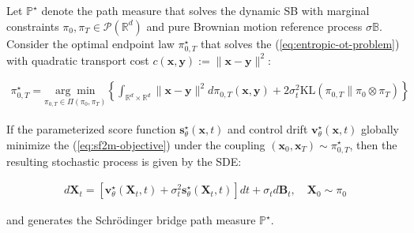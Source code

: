 \documentclass{article}
\begin{document}
\begin{proposition}
    Let $\mathbb{P}^\star$ denote the path measure that solves the dynamic SB with marginal constraints $\pi_0, \pi_T\in \mathcal{P}(\mathbb{R}^d)$ and pure Brownian motion reference process $\sigma\mathbb{B}$. Consider the optimal endpoint law $\pi_{0,T}^\star$ that solves the (\ref{eq:entropic-ot-problem}) with quadratic transport cost $c(\boldsymbol{x},\boldsymbol{y}):= \|\boldsymbol{x}-\boldsymbol{y}\|^2 $:
    \begin{small}
    \begin{align}
        \pi^\star_{0,T}=\underset{\pi_{0,T}\in \Pi(\pi_0, \pi_T)}{\arg\min}\left\{\int_{\mathbb{R}^d\times \mathbb{R}^d}\|\boldsymbol{x}-\boldsymbol{y}\|^2 d\pi_{0,T}(\boldsymbol{x},\boldsymbol{y})+ 2\sigma^2_t\text{KL} (\pi_{0,T}\|\pi_0\otimes \pi_T)\right\}
    \end{align}
    \end{small}
    If the parameterized score function $\boldsymbol{s}^\star_\theta(\boldsymbol{x},t)$ and control drift $\boldsymbol{v}^\star_\theta(\boldsymbol{x},t)$ globally minimize the (\ref{eq:sf2m-objective}) under the coupling $(\boldsymbol{x}_0, \boldsymbol{x}_T)\sim \pi_{0,T}^\star$, then the resulting stochastic process is given by the SDE:
    \begin{small}
    \begin{align}
       d\boldsymbol{X}_t=\left[\boldsymbol{v}_\theta^\star(\boldsymbol{X}_t,t)+\sigma_t^2\boldsymbol{s}_\theta^\star(\boldsymbol{X}_t,t)\right]dt+\sigma_td\boldsymbol{B}_t, \quad \boldsymbol{X}_0 \sim \pi_0
    \end{align}
    \end{small}
    and generates the Schrödinger bridge path measure $\mathbb{P}^\star$.
\end{proposition}
\end{document}
